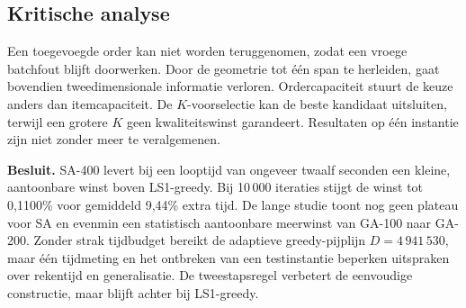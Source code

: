 \documentclass[a4paper,11pt]{article}
\begin{document}
\subsection{Kritische analyse}
Een toegevoegde order kan niet worden teruggenomen, zodat een vroege batchfout
blijft doorwerken. Door de geometrie tot één span te herleiden, gaat bovendien
tweedimensionale informatie verloren. Ordercapaciteit stuurt de keuze anders
dan itemcapaciteit. De $K$-voorselectie
kan de beste kandidaat uitsluiten, terwijl een grotere $K$ geen kwaliteitswinst
garandeert. Resultaten op één instantie zijn niet zonder meer te veralgemenen.

\textbf{Besluit.}
SA-400 levert bij een looptijd van ongeveer twaalf seconden een kleine, aantoonbare winst boven
LS1-greedy. Bij 10\,000 iteraties stijgt de winst tot 0,1100\% voor gemiddeld
9,44\% extra tijd. De lange studie toont nog geen plateau voor SA en evenmin een
statistisch aantoonbare meerwinst van GA-100 naar GA-200. Zonder strak tijdbudget bereikt de adaptieve
greedy-pijplijn $D=4\,941\,530$, maar één tijdmeting en het ontbreken van een
testinstantie beperken uitspraken over rekentijd en generalisatie. De
tweestapsregel verbetert de eenvoudige constructie, maar blijft achter bij
LS1-greedy.

\clearpage
\appendix
{}

\end{document}
